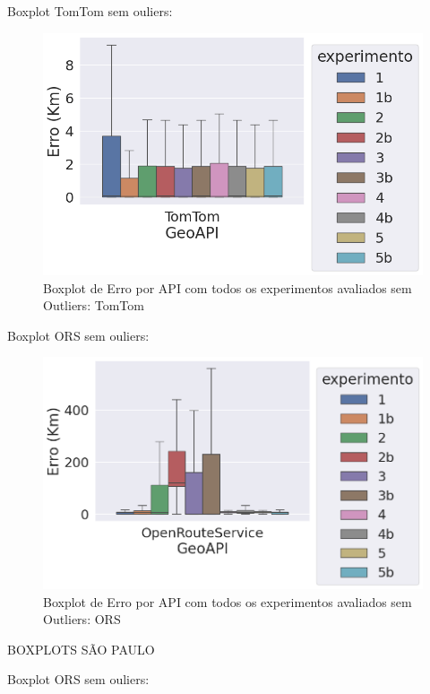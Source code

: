 Boxplot TomTom sem ouliers:

\begin{figure}[h]
    \centering
    \includegraphics[width=\textwidth]{Figuras/boxplotApiTomtomSemOut.png}
    \caption{Boxplot de Erro por API com todos os experimentos avaliados sem Outliers: TomTom}
    \label{fig:boxplot-api-tomtom-semout}
\end{figure}

Boxplot ORS sem ouliers:

\begin{figure}[h]
    \centering
    \includegraphics[width=\textwidth]{Figuras/boxplotApiOrsSemOut.png}
    \caption{Boxplot de Erro por API com todos os experimentos avaliados sem Outliers: ORS}
    \label{fig:boxplot-api-ors-semout}
\end{figure}

BOXPLOTS SÃO PAULO

Boxplot ORS sem ouliers:

